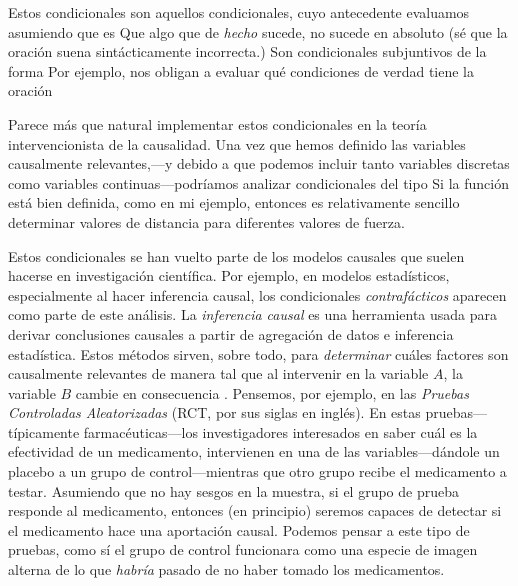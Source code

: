 Estos condicionales son aquellos condicionales, cuyo
antecedente evaluamos asumiendo que es  Que algo que de \emph{hecho} sucede, no sucede en
absoluto (sé que la oración suena sintácticamente
incorrecta.) Son condicionales subjuntivos de la forma
 Por ejemplo, nos obligan a evaluar qué condiciones de
verdad tiene la oración 
 




Parece más que natural implementar estos condicionales en la
teoría intervencionista de la causalidad. Una vez que hemos
definido las variables causalmente relevantes,---y debido a
que podemos incluir tanto variables discretas como variables
continuas---podríamos analizar condicionales del tipo
 Si la función está bien definida,
como en mi ejemplo, entonces es relativamente sencillo
determinar valores de distancia para diferentes valores de
fuerza.

Estos condicionales se han vuelto parte de los modelos
causales que suelen hacerse en investigación científica.
Por ejemplo, en modelos estadísticos, especialmente al hacer
inferencia causal, los condicionales \emph{contrafácticos}
aparecen como parte de este análisis. La  \emph{inferencia
causal} es una herramienta usada para derivar conclusiones
causales a partir de agregación de datos e inferencia
estadística. Estos métodos sirven, sobre todo, para
\emph{determinar} cuáles factores son causalmente relevantes
de manera tal que al intervenir en la variable $A$, la
variable $B$ cambie en consecuencia \parencite{Pearl2016,
Pearl2018, llaudet2023}. Pensemos, por ejemplo, en las
\emph{Pruebas Controladas Aleatorizadas} (RCT, por sus
siglas en inglés). En estas pruebas---típicamente
farmacéuticas---los investigadores interesados en saber cuál
es la efectividad de un medicamento, intervienen en una de
las variables---dándole un placebo a un grupo de
control---mientras que otro grupo recibe el medicamento a
testar. Asumiendo que no hay sesgos en la muestra, si el
grupo de prueba responde al medicamento, entonces (en
principio) seremos capaces de detectar si el medicamento
hace una aportación causal. Podemos pensar a este tipo de
pruebas, como sí el grupo de control funcionara como una
especie de imagen alterna de lo que \emph{habría} pasado de
no haber tomado los medicamentos.



